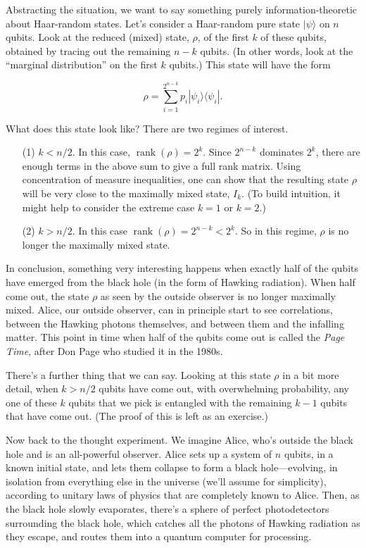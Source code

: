 \documentclass[11pt]{report}
\theoremstyle{plain}
\theoremstyle{definition}
\renewcommand{\ket}[1]{|#1\rangle}
\newcommand{\ketbra}[2]{|#1\rangle\!\langle#2|}
\begin{document}
Abstracting the situation, we want to say something
purely information-theoretic about Haar-random states.
Let's consider a Haar-random pure state $\ket{\psi}$ on $n$ qubits.
Look at the reduced (mixed) state, ${\rho}$, of the first $k$ of these qubits,
obtained by tracing out the remaining $n-k$ qubits.
(In other words, look at the ``marginal distribution'' on the
first $k$ qubits.)  This state will have the form

$$\rho = \sum_{i=1}^{2^{n-k}} p_i \ketbra{\psi_i}{\psi_i}.$$

What does this state look like?  There are two regimes of interest.

\begin{itemize}
\item[(1)] $k<n/2$. In this case, $\operatorname*{rank}(\rho) = 2^k$.
Since $2^{n-k}$ dominates $2^k$, there are enough terms in
the above sum to give a full rank matrix. Using
concentration of measure inequalities, one can show that
the resulting state $\rho$ will be
very close to the maximally mixed state, $I_k$.  (To build intuition, it might help
to consider the extreme case $k=1$ or $k=2$.)
\item[(2)] $k > n/2$.
In this case $\operatorname*{rank}(\rho) = 2^{n-k} < 2^k$.  So in this regime,
$\rho$ is
no longer the maximally mixed state.
\end{itemize}

In conclusion, something very interesting happens when exactly half of the
qubits have emerged from the black hole (in the form of
Hawking radiation).
When half come out, the state $\rho$ as seen by the
outside observer is no longer maximally mixed.
Alice, our outside observer, can in principle start to see correlations, between the Hawking photons themselves, and between them and the infalling matter.
This point in time when half of the qubits come out is
called the {\em Page Time}, after Don Page who studied
it in the 1980s.

There's a further thing that we can say.
Looking at this state $\rho$ in a bit more detail,
when $k>n/2$ qubits have come out, with overwhelming probability, any one of these $k$ qubits
that we pick is entangled with the remaining $k-1$ qubits that
have come out.  (The proof of this is left as an exercise.)

Now back to the thought experiment.
We imagine Alice, who's outside the black hole and is
an all-powerful observer.  Alice sets up a system of $n$ qubits,
in a known initial state, and lets them collapse to form a black hole---evolving,
in isolation from everything else in the universe (we'll assume for simplicity), according
to unitary laws of physics that are completely known to Alice.
Then, as the black hole slowly evaporates, there's a sphere of perfect photodetectors surrounding
the black hole, which catches all the photons of Hawking radiation as they escape,
and routes them into a quantum computer for
processing.
\end{document}
